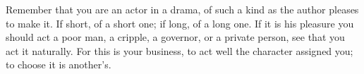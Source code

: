 Remember that you are an actor in a drama, of such a kind as the author pleases
to make  it. If short, of  a short one;  if long, of a  long one. If it  is his
pleasure you should act a poor man, a cripple, a governor, or a private person,
see that  you act  it naturally.  For this is  your business,  to act  well the
character assigned you; to choose it is another's.
